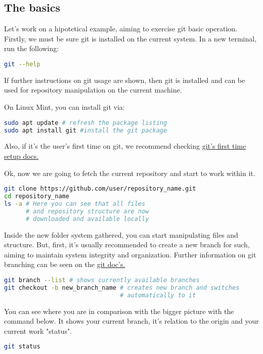 \documentclass[a4paper,11pt]{article}
\begin{document}
\subsection{The basics}
Let's work on a hipotetical example, aiming to exercise git basic operation.
Firstly, we must be sure git is installed on the current system. In a new
terminal, run the following:
\begin{lstlisting}[language=bash]
git --help
\end{lstlisting}
If further instructions on git usage are shown, then git is installed and can be
used for repository manipulation on the current machine. 
\begin{tipbox}
On Linux Mint, you can install git via:
\begin{lstlisting}[language=bash]
sudo apt update # refresh the package listing
sudo apt install git #install the git package
\end{lstlisting}
Also, if it's the user's first time on git, we recommend checking
\href{https://git-scm.com/book/en/v2/Getting-Started-First-Time-Git-Setup}{git's
first time setup docs.} 
\end{tipbox}
Ok, now we are going to fetch the current repository and start to work within
it.
\begin{lstlisting}[language=bash]
git clone https://github.com/user/repository_name.git
cd repository_name
ls -a # Here you can see that all files
      # and repository structure are now
      # downloaded and available locally
\end{lstlisting}
Inside the new folder system gathered, you can start manipulating files and
structure. But, first, it's usually recommended to create a new branch for such,
aiming to maintain system integrity and organization. Further information on git
branching can be seen on the \href{https://git-scm.com/docs/git-branch}{git
doc's.} 
\begin{lstlisting}[language=bash]
git branch --list # shows currently available branches
git checkout -b new_branch_name # creates new branch and switches
                                # automatically to it 
\end{lstlisting}
\begin{tipbox}
You can see where you are in comparison with the bigger picture with the command
below. It shows your current branch, it's relation to the origin and your
current work "status".
\begin{lstlisting}[language=bash]
git status
\end{lstlisting}
\end{tipbox}
\end{document}
